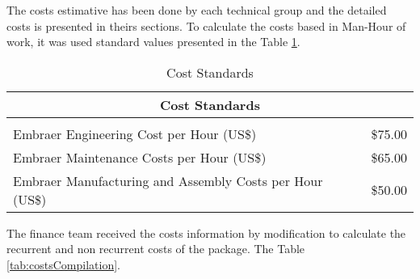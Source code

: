 
The costs estimative has been done by each technical group and the detailed costs is presented in theirs sections.
To calculate the costs based in Man-Hour of work, it was used standard values presented in the Table \ref{tab:costStandards}.


\begin{table}[htbp]
  \centering
  \caption{Cost Standards}
    \begin{tabular}{rr}
    \toprule
    \multicolumn{2}{c}{\textbf{Cost Standards}} \\
    \midrule
    \multicolumn{1}{l}{} &  \\
    \multicolumn{1}{l}{Embraer Engineering Cost per Hour (US\$)} & \$75.00 \\
    \multicolumn{1}{l}{Embraer Maintenance Costs per Hour (US\$)} & \$65.00 \\
    \multicolumn{1}{l}{Embraer Manufacturing and Assembly Costs per Hour (US\$)} & \$50.00 \\
    \bottomrule
    \end{tabular}%
  \label{tab:costStandards}%
\end{table}%


The finance team received the costs information by modification to calculate the recurrent and non recurrent costs of the package. The Table \ref{tab:costsCompilation}.

